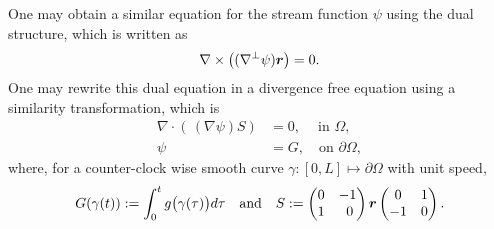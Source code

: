 \documentclass[11pt]{amsart}
\theoremstyle{plain}
\numberwithin{equation}{section}
\numberwithin{Thm}{section}
\def\r{{\bf r}}
\def\r{\mbox{\boldmath$r$}}
\begin{document}
One may obtain a similar equation for the stream function $\psi$ using the dual structure, which is written as
\begin{equation}\label{curlfreeA}
\nabla\times\big((\nabla^\perp\psi)\r\big)=0.
\end{equation}
One may rewrite this dual equation in a divergence free equation using a similarity transformation, which is
\begin{align}
 \nabla\cdot(\,(\nabla \psi)S)  &=0,\ \quad \text{in $\Omega$}, \label{eqn:div2}\\
 \psi&=G, \quad \text{on $\partial\Omega$},                \label{eqn:div2Nbdry}
\end{align}
where, for a counter-clock wise smooth curve $\gamma:[0, L] \mapsto \partial\Omega$ with unit speed,
\begin{equation}\label{G}
G(\gamma(t)) := \int_0^t g\big(\gamma(\tau)\big) d\tau\quad\text{and}\quad S:=\begin{pmatrix} 0 & -1 \\ 1 & \ 0 \end{pmatrix} \r\begin{pmatrix} 0 & 1 \\ -1 & 0 \end{pmatrix}.
\end{equation}
\end{document}
